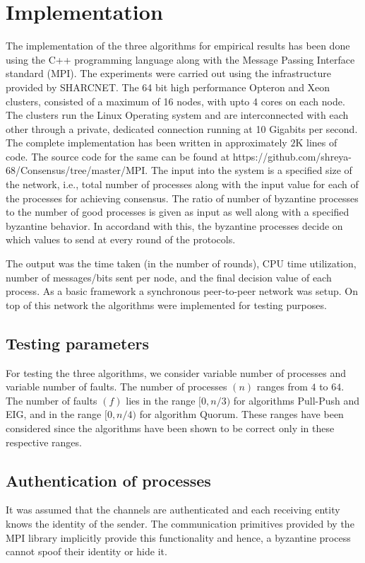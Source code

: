 ﻿\section{Implementation}
\label{sec:eval}

The implementation of the three algorithms for empirical results has been done using the C++ programming language along with the Message Passing Interface standard (MPI). The experiments were carried out using the infrastructure provided by SHARCNET. The 64 bit high performance Opteron and Xeon clusters, consisted of a maximum of 16 nodes, with upto 4 cores on each node. The clusters run the Linux Operating system and are interconnected with each other through a private, dedicated connection running at 10 Gigabits per second. The complete implementation has been written in approximately $2$K lines of code. The source code for the same can be found at https://github.com/shreya-68/Consensus/tree/master/MPI. The input into the system is a specified size of the network, i.e., total number of processes along with the input value for each of the processes for achieving consensus. The ratio of number of byzantine processes to the number of good processes is given as input as well along with a specified byzantine behavior. In accordand with this, the byzantine processes decide on which values to send at every round of the protocols. 

The output was the time taken (in the number of rounds), CPU time utilization, number of messages/bits sent per node, and the final decision value of each process. As a basic framework a synchronous peer-to-peer network was setup. On top of this network the algorithms were implemented for testing purposes.  

\subsection{Testing parameters}
For testing the three algorithms, we consider variable number of processes and variable number of faults. The number of processes $(n)$ ranges from $4$ to $64$. The number of faults $(f)$ lies in the range $[0, n/3)$ for algorithms Pull-Push and EIG, and in the range $[0, n/4)$ for algorithm Quorum. These ranges have been considered since the algorithms have been shown to be correct only in these respective ranges.

\subsection{Authentication of processes}
It was assumed that the channels are authenticated and each receiving entity knows the identity of the sender. The communication primitives provided by the MPI library implicitly provide this functionality and hence, a byzantine process cannot spoof their identity or hide it.

